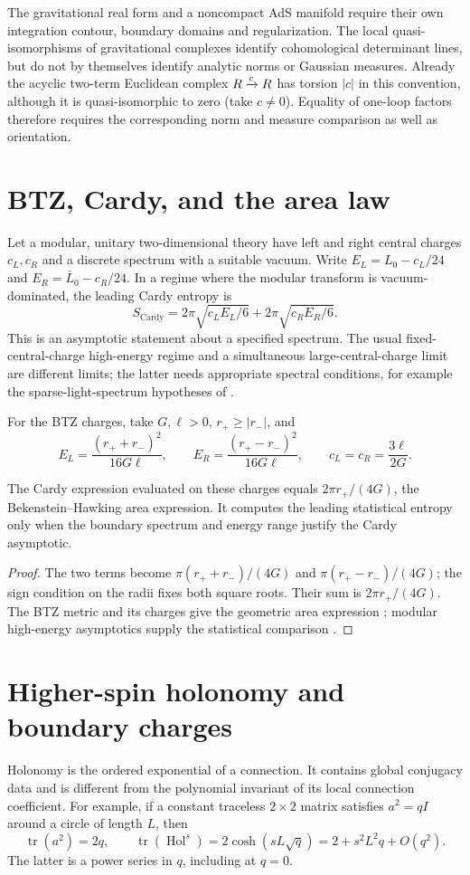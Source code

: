 The gravitational real form and a noncompact AdS manifold require their
own integration contour, boundary domains and regularization. The local
quasi-isomorphisms of gravitational complexes identify cohomological
determinant lines, but do not by themselves identify analytic norms or
Gaussian measures. Already the acyclic two-term Euclidean complex
$R\xrightarrow{c}R$ has torsion $|c|$ in this convention, although it
is quasi-isomorphic to zero (take $c\ne0$). Equality of one-loop factors therefore requires
the corresponding norm and measure comparison as well as orientation.

\section{BTZ, Cardy, and the area law}
Let a modular, unitary two-dimensional theory have left and right central
charges $c_L,c_R$ and a discrete spectrum with a suitable vacuum. Write
$E_L=L_0-c_L/24$ and $E_R=\bar L_0-c_R/24$. In a regime where the
modular transform is vacuum-dominated, the leading Cardy entropy is
\[
 S_{\mathrm{Cardy}}=2\pi\sqrt{c_LE_L/6}
                   +2\pi\sqrt{c_RE_R/6}.
\]
This is an asymptotic statement about a specified spectrum. The usual
fixed-central-charge high-energy regime and a simultaneous large-central-charge
limit are different limits; the latter needs appropriate spectral
conditions, for example the sparse-light-spectrum hypotheses of
\cite{HartmanKellerStoica}.

For the BTZ charges, take $G,\ell>0$, $r_+\geq|r_-|$, and
\[
 E_L=\frac{(r_++r_-)^2}{16G\ell},\qquad
 E_R=\frac{(r_+-r_-)^2}{16G\ell},\qquad
 c_L=c_R=\frac{3\ell}{2G}.
\]

\begin{proposition}
The Cardy expression evaluated on these charges equals
$2\pi r_+/(4G)$, the Bekenstein--Hawking area expression. It computes
the leading statistical entropy only when the boundary spectrum and
energy range justify the Cardy asymptotic.
\end{proposition}
\begin{proof}
The two terms become $\pi(r_++r_-)/(4G)$ and
$\pi(r_+-r_-)/(4G)$; the sign condition on the radii fixes both square
roots. Their sum is $2\pi r_+/(4G)$. The BTZ metric and its charges give
the geometric area expression \cite{BTZ1992}; modular high-energy
asymptotics supply the statistical comparison \cite{Cardy1986}.
\end{proof}

\section{Higher-spin holonomy and boundary charges}
Holonomy is the ordered exponential of a connection. It contains global
conjugacy data and is different from the polynomial invariant of its local
connection coefficient. For example, if a constant traceless $2\times2$
matrix satisfies $a^2=qI$ around a circle of length $L$, then
\[
 \operatorname{tr}(a^2)=2q,\qquad
 \operatorname{tr}(\operatorname{Hol}^s)
   =2\cosh(sL\sqrt q)
   =2+s^2L^2q+O(q^2).
\]
The latter is a power series in $q$, including at $q=0$.

